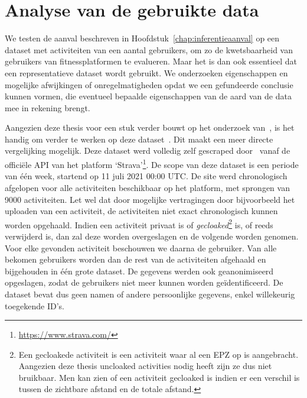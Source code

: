 \chapter{Analyse van de gebruikte data}
We testen de aanval beschreven in Hoofdstuk~\ref{chap:inferentieaanval} op een
dataset met activiteiten van een aantal gebruikers, om zo de kwetsbaarheid van
gebruikers van fitnessplatformen te evalueren. Maar het is dan ook essentieel
dat een representatieve dataset wordt gebruikt. We onderzoeken eigenschappen en
mogelijke afwijkingen of onregelmatigheden opdat we een gefundeerde conclusie
kunnen vormen, die eventueel bepaalde eigenschappen van de aard van de data mee
in rekening brengt.

Aangezien deze thesis voor een stuk verder bouwt op het onderzoek
van~\citeauthor{Dhondt}, is het handig om verder te werken op deze
dataset~\cite{Dhondt}. Dit maakt een meer directe vergelijking mogelijk. Deze
dataset werd volledig zelf gescraped door~\citeauthor{Dhondt} vanaf de
officiële \ac{API} van het platform
`Strava'\footnote{\url{https://www.strava.com/}}. De scope van deze dataset is
een periode van één week, startend op 11 juli 2021 00:00 \ac{UTC}. De site werd
chronologisch afgelopen voor alle activiteiten beschikbaar op het platform, met
sprongen van 9000 activiteiten. Let wel dat door mogelijke vertragingen door
bijvoorbeeld het uploaden van een activiteit, de activiteiten niet exact
chronologisch kunnen worden opgehaald. Indien een activiteit privaat is of
\textit{gecloaked}\footnote{Een gecloakede activiteit is een activiteit waar al
    een EPZ op is aangebracht. Aangezien deze thesis uncloaked activities nodig
    heeft zijn ze dus niet bruikbaar. Men kan zien of een activiteit gecloaked is
    indien er een verschil is tussen de zichtbare afstand en de totale afstand.}
is, of reeds verwijderd is, dan zal deze worden overgeslagen en de volgende
worden genomen. Voor elke gevonden activiteit beschouwen we daarna de
gebruiker. Van alle bekomen gebruikers worden dan de rest van de activiteiten
afgehaald en bijgehouden in één grote dataset. De gegevens werden ook
geanonimiseerd opgeslagen, zodat de gebruikers niet meer kunnen worden
geïdentificeerd. De dataset bevat dus geen namen of andere persoonlijke
gegevens, enkel willekeurig toegekende ID's.

